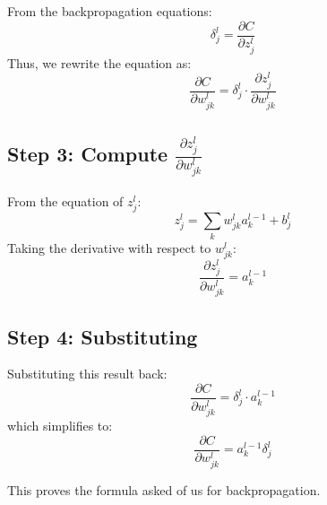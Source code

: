 \documentclass{article}
\begin{document}
From the backpropagation equations:
\begin{equation}
    \delta_j^l = \frac{\partial C}{\partial z_j^l}
\end{equation}
Thus, we rewrite the equation as:
\begin{equation}
    \frac{\partial C}{\partial w_{jk}^l} = \delta_j^l \cdot \frac{\partial z_j^l}{\partial w_{jk}^l}
\end{equation}

\subsection{Step 3: Compute $\frac{\partial z_j^l}{\partial w_{jk}^l}$}
From the equation of $z_j^l$:
\begin{equation}
    z_j^l = \sum_k w_{jk}^{l} a_k^{l-1} + b_j^l
\end{equation}
Taking the derivative with respect to $w_{jk}^l$:
\begin{equation}
    \frac{\partial z_j^l}{\partial w_{jk}^l} = a_k^{l-1}
\end{equation}

\subsection{Step 4: Substituting}
Substituting this result back:
\begin{equation}
    \frac{\partial C}{\partial w_{jk}^l} = \delta_j^l \cdot a_k^{l-1}
\end{equation}
which simplifies to:
\begin{equation}
    \frac{\partial C}{\partial w_{jk}^l} = a_k^{l-1} \delta_j^l
\end{equation}

This proves the formula asked of us for backpropagation.
\end{document}
